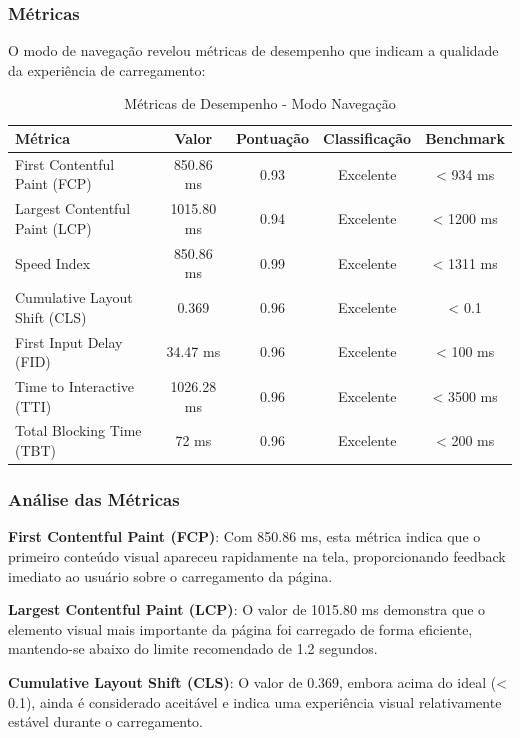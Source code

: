 \subsubsection{Métricas}

O modo de navegação revelou métricas de desempenho que indicam a qualidade da experiência de carregamento:

\begin{table}[h]
\centering
\caption{Métricas de Desempenho - Modo Navegação}
\begin{tabular}{|l|c|c|c|c|}
\hline
\textbf{Métrica} & \textbf{Valor} & \textbf{Pontuação} & \textbf{Classificação} & \textbf{Benchmark} \\
\hline
First Contentful Paint (FCP) & 850.86 ms & 0.93 & Excelente & < 934 ms \\
\hline
Largest Contentful Paint (LCP) & 1015.80 ms & 0.94 & Excelente & < 1200 ms \\
\hline
Speed Index & 850.86 ms & 0.99 & Excelente & < 1311 ms \\
\hline
Cumulative Layout Shift (CLS) & 0.369 & 0.96 & Excelente & < 0.1 \\
\hline
First Input Delay (FID) & 34.47 ms & 0.96 & Excelente & < 100 ms \\
\hline
Time to Interactive (TTI) & 1026.28 ms & 0.96 & Excelente & < 3500 ms \\
\hline
Total Blocking Time (TBT) & 72 ms & 0.96 & Excelente & < 200 ms \\
\hline
\end{tabular}
\end{table}

\subsubsection{Análise das Métricas}

\textbf{First Contentful Paint (FCP)}: Com 850.86 ms, esta métrica indica que o primeiro conteúdo visual apareceu rapidamente na tela, proporcionando feedback imediato ao usuário sobre o carregamento da página.

\textbf{Largest Contentful Paint (LCP)}: O valor de 1015.80 ms demonstra que o elemento visual mais importante da página foi carregado de forma eficiente, mantendo-se abaixo do limite recomendado de 1.2 segundos.

\textbf{Cumulative Layout Shift (CLS)}: O valor de 0.369, embora acima do ideal (< 0.1), ainda é considerado aceitável e indica uma experiência visual relativamente estável durante o carregamento.

